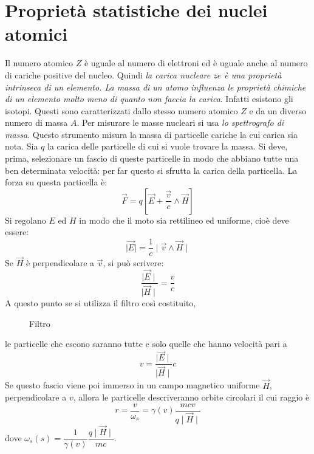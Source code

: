 \chapter{Proprietà statistiche dei nuclei atomici}
Il numero atomico $Z$  è uguale al numero di elettroni ed
è uguale anche al numero di cariche positive del nucleo. Quindi \textit{la
carica nucleare $ze$ è una proprietà intrinseca di un elemento. La massa di un
atomo influenza le proprietà chimiche di un elemento molto meno di quanto non
faccia la carica}. Infatti esistono gli isotopi. Questi sono caratterizzati
dallo stesso numero atomico $Z$ e da un diverso numero di massa $A$. Per
misurare le masse nucleari si usa \textit{lo spettrografo di massa}. Questo
strumento misura la massa di particelle cariche la cui carica sia nota. Sia $q$
la carica delle particelle di cui si vuole trovare la massa. Si deve, prima,
selezionare un fascio di queste particelle in modo che abbiano tutte una ben
determinata velocità: per far questo si sfrutta la carica della particella. La
forza su questa particella è:
\begin{equation}
\vec{F} = q\left[ \vec{E} + \dfrac{\vec{v}}{c}\wedge \vec{H} \right]
\end{equation}
Si regolano $E$ ed $H$ in modo che il moto sia rettilineo ed uniforme, cioè deve
essere:
\begin{equation}
\mid \vec{E} \mid = \dfrac{1}{c} \mid \vec{v} \wedge \vec{H} \mid
\end{equation}
Se $\vec{H}$ è perpendicolare a $\vec{v}$, si può scrivere:
\begin{equation}
\dfrac{\mid \vec{E} \mid}{\mid \vec{H} \mid} = \dfrac{v}{c}
\end{equation}
A questo punto se si utilizza il filtro così costituito,
\begin{figure}[!htbp]
	\centering
	
	\caption{Filtro}
\end{figure}
le particelle che escono saranno tutte e solo quelle che hanno velocità pari a 
\begin{equation}
v = \dfrac{\mid \vec{E}\mid}{\mid \vec{H} \mid}c
\end{equation}
Se questo fascio viene poi immerso in un campo magnetico uniforme $\vec{H}$,
perpendicolare a $v$, allora le particelle descriveranno orbite circolari il cui
raggio è
\begin{equation}
r = \dfrac{v}{\omega _{s}} = \gamma (v) \dfrac{mcv}{q \mid \vec{H} \mid}
\end{equation}
dove $\omega _s (s) = \dfrac{1}{\gamma (v)} \dfrac{q \mid \vec{H} \mid}{mc}$.

